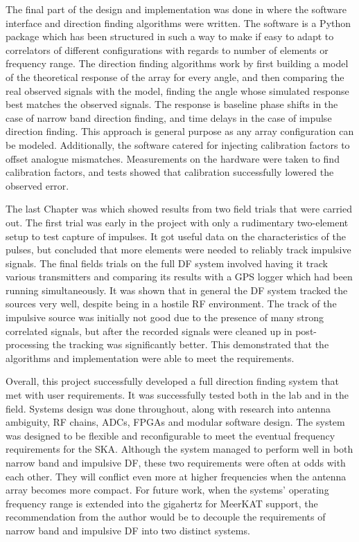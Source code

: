 The final part of the design and implementation was done in  where the software interface and direction finding algorithms were written. The software is a Python package which has been structured in such a way to make if easy to adapt to correlators of different configurations with regards to number of elements or frequency range. The direction finding algorithms work by first building a model of the theoretical response of the array for every angle, and then comparing the real observed signals with the model, finding the angle whose simulated response best matches the observed signals. The response is baseline phase shifts in the case of narrow band direction finding, and time delays in the case of impulse direction finding. This approach is general purpose as any array configuration can be modeled. Additionally, the software catered for injecting calibration factors to offset analogue mismatches. Measurements on the hardware were taken to find calibration factors, and tests showed that calibration successfully lowered the observed error.

The last Chapter was  which showed results from two field trials that were carried out. The first trial was early in the project with only a rudimentary two-element setup to test capture of impulses. It got useful data on the characteristics of the pulses, but concluded that more elements were needed to reliably track impulsive signals. The final fields trials on the full DF system involved having it track various transmitters and comparing its results with a GPS logger which had been running simultaneously. It was shown that in general the DF system tracked the sources very well, despite being in a hostile RF environment. The track of the impulsive source was initially not good due to the presence of many strong correlated signals, but after the recorded signals were cleaned up in post-processing the tracking was significantly better. This demonstrated that the algorithms and implementation were able to meet the requirements.

Overall, this project successfully developed a full direction finding system that met with user requirements. It was successfully tested both in the lab and in the field. Systems design was done throughout, along with research into antenna ambiguity, RF chains, ADCs, FPGAs and modular software design. The system was designed to be flexible and reconfigurable to meet the eventual frequency requirements for the SKA. Although the system managed to perform well in both narrow band and impulsive DF, these two requirements were often at odds with each other. They will conflict even more at higher frequencies when the antenna array becomes more compact. For future work, when the systems' operating frequency range is extended into the gigahertz for MeerKAT support, the recommendation from the author would be to decouple the requirements of narrow band and impulsive DF into two distinct systems.
